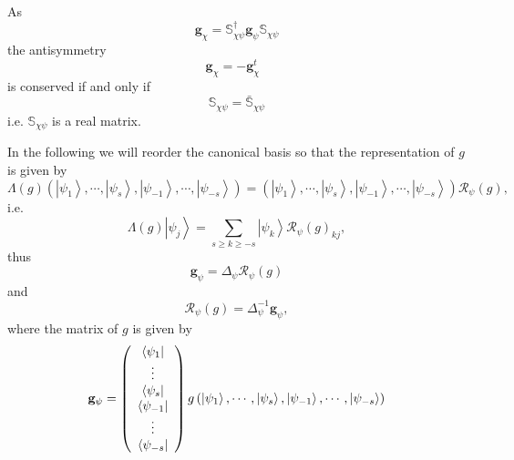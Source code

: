 \documentclass[aps,preprint]{revtex4}%
\begin{document}
As
\begin{equation}
\mathbf{g}_{\chi}=\mathbb{S}_{\chi\psi}^{\dagger}\mathbf{g}_{\psi}%
\mathbb{S}_{\chi\psi}%
\end{equation}
the antisymmetry
\begin{equation}
\mathbf{g}_{\chi}=-\mathbf{g}_{\chi}^{t}\text{ }%
\end{equation}
is conserved if and only if
\begin{equation}
\mathbb{S}_{\chi\psi}=\mathbb{\bar{S}}_{\chi\psi}%
\end{equation}
i.e. $\mathbb{S}_{\chi\psi}$ is a real matrix.

In the following we will reorder the canonical basis so that the
representation of $g$ is given by
\begin{equation}
\Lambda\left(  g\right)  \left(  \left\vert \psi_{1}\right\rangle
,\cdots,\left\vert \psi_{s}\right\rangle ,\left\vert \psi_{-1}\right\rangle
,\cdots,\left\vert \psi_{-s}\right\rangle \right)  =\left(  \left\vert
\psi_{1}\right\rangle ,\cdots,\left\vert \psi_{s}\right\rangle ,\left\vert
\psi_{-1}\right\rangle ,\cdots,\left\vert \psi_{-s}\right\rangle \right)
\mathcal{R}_{\psi}\left(  g\right)  ,
\end{equation}
i.e.
\begin{equation}
\Lambda\left(  g\right)  \left\vert \psi_{j}\right\rangle =\sum_{s\geq
k\geq-s}\left\vert \psi_{k}\right\rangle \mathcal{R}_{\psi}\left(  g\right)
_{kj},
\end{equation}
thus
\begin{equation}
\mathbf{g}_{\psi}=\Delta_{\psi}\mathcal{R}_{\psi}\left(  g\right)
\end{equation}
and
\begin{equation}
\mathcal{R}_{\psi}\left(  g\right)  =\Delta_{\psi}^{-1}\mathbf{g}_{\psi},
\end{equation}
where the matrix of $g$ is given by
\begin{equation}
\mathbf{g}_{\psi}=\left(
\begin{array}
[c]{c}%
\left\langle \psi_{1}\right\vert \\
\vdots\\
\left\langle \psi_{s}\right\vert \\
\left\langle \psi_{-1}\right\vert \\
\vdots\\
\left\langle \psi_{-s}\right\vert
\end{array}
\right)  g\left(  \left\vert \psi_{1}\right\rangle ,\cdots,\left\vert \psi
_{s}\right\rangle ,\left\vert \psi_{-1}\right\rangle ,\cdots,\left\vert
\psi_{-s}\right\rangle \right)
\end{equation}
\end{document}
